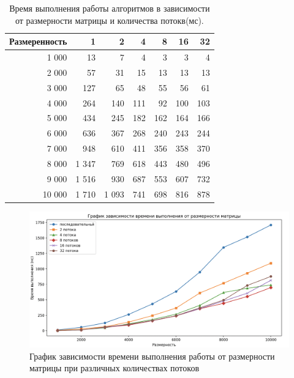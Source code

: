 \begin{table}[!ht]
    \centering
    \caption{\label{tab:table} Время выполнения работы алгоритмов в зависимости от размерности 
    матрицы и количества потокв(мс).}
    \begin{tabular}{|r|r|r|r|r|r|r|}
        \hline
            Размеренность & 1 & 2 & 4 & 8 & 16 & 32 \\ \hline
            1 000 & 13 & 7 & 4 & 3 & 3 & 4 \\ \hline
            2 000 & 57 & 31 & 15 & 13 & 13 & 13 \\ \hline
            3 000 & 127 & 65 & 48 & 55 & 56 & 61 \\ \hline
            4 000 & 264 & 140 & 111 & 92 & 100 & 103 \\ \hline
            5 000 & 434 & 245 & 182 & 162 & 164 & 166 \\ \hline
            6 000 & 636 & 367 & 268 & 240 & 243 & 244 \\ \hline
            7 000 & 948 & 610 & 411 & 356 & 358 & 370 \\ \hline
            8 000 & 1 347 & 769 & 618 & 443 & 480 & 496 \\ \hline
            9 000 & 1 516 & 930 & 687 & 553 & 607 & 732 \\ \hline
            10 000 & 1 710 & 1 093 & 741 & 698 & 816 & 878 \\ \hline
        \end{tabular}
\end{table}

\clearpage

\begin{figure}[h]
	\centering
	\includegraphics[width=1\textwidth]{img/graph.png}
	\caption{График зависимости времени выполнения работы от размерности матрицы при различных количествах потоков}
	\label{img:graph}
\end{figure}

